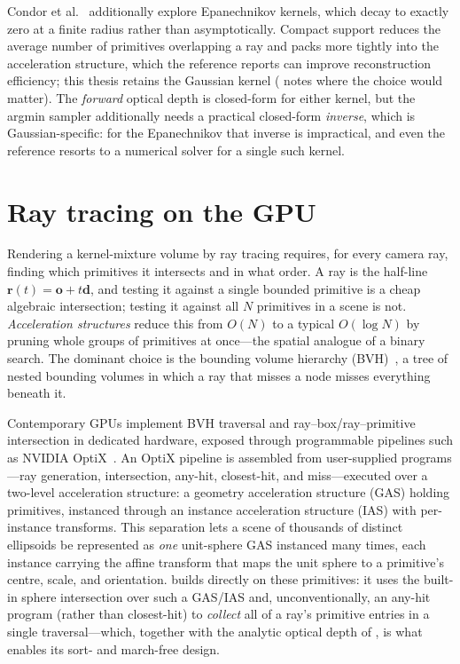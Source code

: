 Condor et al.~\cite{DSYG} additionally explore Epanechnikov kernels, which decay to exactly zero at
a finite radius rather than asymptotically. Compact support reduces the average number of primitives
overlapping a ray and packs more tightly into the acceleration structure, which the reference reports
can improve reconstruction efficiency; this thesis retains the Gaussian kernel ( notes where the choice
would matter). The \emph{forward} optical depth is closed-form for either kernel, but the argmin sampler
additionally needs a practical closed-form \emph{inverse}, which is Gaussian-specific: for the
Epanechnikov that inverse is impractical, and even the reference resorts to a numerical solver for a
single such kernel.

\section{Ray tracing on the GPU}
\label{sec:gpu-ray-tracing}

Rendering a kernel-mixture volume by ray tracing requires, for every camera ray, finding which
primitives it intersects and in what order. A ray is the half-line $\bm{r}(t)=\bm{o}+t\bm{d}$, and
testing it against a single bounded primitive is a cheap algebraic intersection; testing it against
all $N$ primitives in a scene is not. \emph{Acceleration structures} reduce this from $O(N)$ to a typical
$O(\log N)$ by pruning whole groups of primitives at once---the spatial analogue of a binary search.
The dominant choice is the bounding
volume hierarchy (BVH)~\cite{KayKajiya1986,MacDonaldBooth1990}, a tree of nested
bounding volumes in which a ray that misses a node misses everything beneath it.

Contemporary GPUs implement BVH traversal and ray--box/ray--primitive intersection in dedicated
hardware, exposed through programmable pipelines such as NVIDIA OptiX~\cite{Optix}. An OptiX pipeline
is assembled from user-supplied programs---ray generation, intersection, any-hit, closest-hit, and
miss---executed over a two-level acceleration structure: a geometry acceleration structure (GAS)
holding primitives, instanced through an instance acceleration structure (IAS) with per-instance
transforms. This separation lets a scene of thousands of distinct ellipsoids be represented as
\emph{one} unit-sphere GAS instanced many times, each instance carrying the affine transform that
maps the unit sphere to a primitive's centre, scale, and orientation.  builds
directly on these primitives: it uses the built-in sphere intersection over such a GAS/IAS and,
unconventionally, an any-hit program (rather than closest-hit) to \emph{collect} all of a ray's
primitive entries in a single traversal---which, together with the analytic optical depth of
, is what enables its sort- and march-free design.
